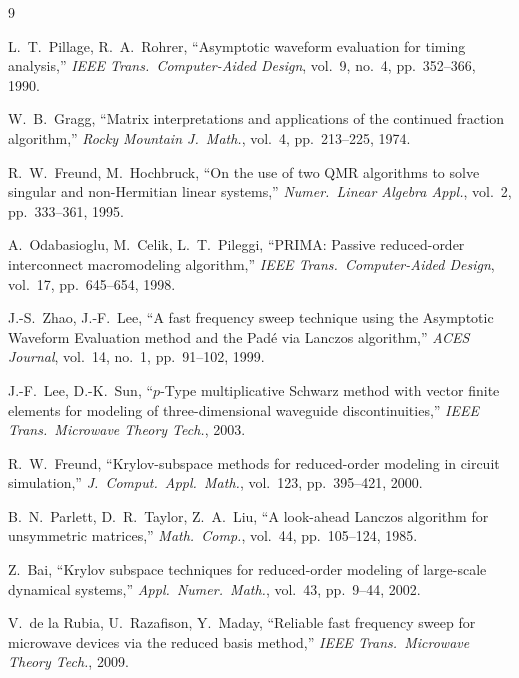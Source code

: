 \documentclass[11pt,a4paper]{ctexart}
\begin{document}
\begin{thebibliography}{9}

L.\ T.\ Pillage, R.\ A.\ Rohrer,
``Asymptotic waveform evaluation for timing analysis,''
\emph{IEEE Trans.\ Computer-Aided Design}, vol.\ 9, no.\ 4, pp.\ 352--366, 1990.

W.\ B.\ Gragg,
``Matrix interpretations and applications of the continued fraction algorithm,''
\emph{Rocky Mountain J.\ Math.}, vol.\ 4, pp.\ 213--225, 1974.

R.\ W.\ Freund, M.\ Hochbruck,
``On the use of two QMR algorithms to solve singular and non-Hermitian linear systems,''
\emph{Numer.\ Linear Algebra Appl.}, vol.\ 2, pp.\ 333--361, 1995.

A.\ Odabasioglu, M.\ Celik, L.\ T.\ Pileggi,
``PRIMA: Passive reduced-order interconnect macromodeling algorithm,''
\emph{IEEE Trans.\ Computer-Aided Design}, vol.\ 17, pp.\ 645--654, 1998.

J.-S.\ Zhao, J.-F.\ Lee,
``A fast frequency sweep technique using the Asymptotic Waveform Evaluation method and the Pad\'e via Lanczos algorithm,''
\emph{ACES Journal}, vol.\ 14, no.\ 1, pp.\ 91--102, 1999.

J.-F.\ Lee, D.-K.\ Sun,
``$p$-Type multiplicative Schwarz method with vector finite elements for modeling of three-dimensional waveguide discontinuities,''
\emph{IEEE Trans.\ Microwave Theory Tech.}, 2003.

R.\ W.\ Freund,
``Krylov-subspace methods for reduced-order modeling in circuit simulation,''
\emph{J.\ Comput.\ Appl.\ Math.}, vol.\ 123, pp.\ 395--421, 2000.

B.\ N.\ Parlett, D.\ R.\ Taylor, Z.\ A.\ Liu,
``A look-ahead Lanczos algorithm for unsymmetric matrices,''
\emph{Math.\ Comp.}, vol.\ 44, pp.\ 105--124, 1985.

Z.\ Bai,
``Krylov subspace techniques for reduced-order modeling of large-scale dynamical systems,''
\emph{Appl.\ Numer.\ Math.}, vol.\ 43, pp.\ 9--44, 2002.

V.\ de la Rubia, U.\ Razafison, Y.\ Maday,
``Reliable fast frequency sweep for microwave devices via the reduced basis method,''
\emph{IEEE Trans.\ Microwave Theory Tech.}, 2009.

\end{thebibliography}
\end{document}
